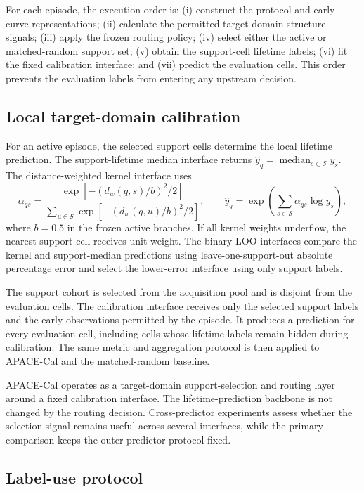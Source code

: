 \documentclass[preprint,12pt]{elsarticle}
\begin{document}
For each episode, the execution order is: (i) construct the protocol and early-curve representations; (ii) calculate the permitted target-domain structure signals; (iii) apply the frozen routing policy; (iv) select either the active or matched-random support set; (v) obtain the support-cell lifetime labels; (vi) fit the fixed calibration interface; and (vii) predict the evaluation cells. This order prevents the evaluation labels from entering any upstream decision.

\subsection{Local target-domain calibration}

For an active episode, the selected support cells determine the local lifetime prediction. The support-lifetime median interface returns $\hat y_q=\operatorname{median}_{s\in\mathcal{S}}y_s$. The distance-weighted kernel interface uses
\begin{equation}
\alpha_{qs}=\frac{\exp[-(d_w(q,s)/b)^2/2]}{\sum_{u\in\mathcal{S}}\exp[-(d_w(q,u)/b)^2/2]},\qquad
\hat y_q=\exp\!\left(\sum_{s\in\mathcal{S}}\alpha_{qs}\log y_s\right),
\end{equation}
where $b=0.5$ in the frozen active branches. If all kernel weights underflow, the nearest support cell receives unit weight. The binary-LOO interfaces compare the kernel and support-median predictions using leave-one-support-out absolute percentage error and select the lower-error interface using only support labels.

The support cohort is selected from the acquisition pool and is disjoint from the evaluation cells. The calibration interface receives only the selected support labels and the early observations permitted by the episode. It produces a prediction for every evaluation cell, including cells whose lifetime labels remain hidden during calibration. The same metric and aggregation protocol is then applied to APACE-Cal and the matched-random baseline.

APACE-Cal operates as a target-domain support-selection and routing layer around a fixed calibration interface. The lifetime-prediction backbone is not changed by the routing decision. Cross-predictor experiments assess whether the selection signal remains useful across several interfaces, while the primary comparison keeps the outer predictor protocol fixed.

\subsection{Label-use protocol}
\end{document}
